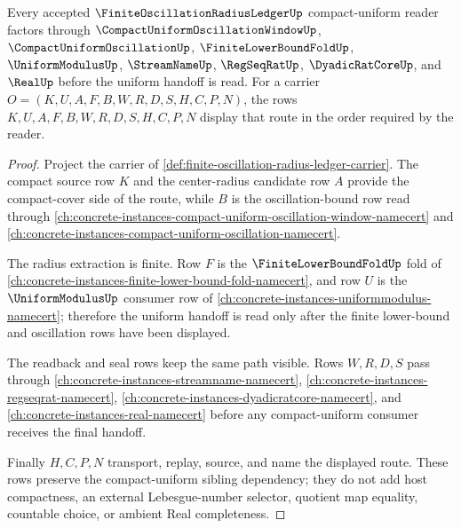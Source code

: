 \begin{theorem}
\label{thm:finite-oscillation-radius-ledger-compact-uniform-link}
Every accepted $\FiniteOscillationRadiusLedgerUp$ compact-uniform reader factors through $\CompactUniformOscillationWindowUp$, $\CompactUniformOscillationUp$, $\FiniteLowerBoundFoldUp$, $\UniformModulusUp$, $\StreamNameUp$, $\RegSeqRatUp$, $\DyadicRatCoreUp$, and $\RealUp$ before the uniform handoff is read. For a carrier $O=(K,U,A,F,B,W,R,D,S,H,C,P,N)$, the rows $K,U,A,F,B,W,R,D,S,H,C,P,N$ display that route in the order required by the reader.
\end{theorem}
\begin{proof}
Project the carrier of \autoref{def:finite-oscillation-radius-ledger-carrier}. The compact source row $K$ and the center-radius candidate row $A$ provide the compact-cover side of the route, while $B$ is the oscillation-bound row read through \autoref{ch:concrete-instances-compact-uniform-oscillation-window-namecert} and \autoref{ch:concrete-instances-compact-uniform-oscillation-namecert}.

The radius extraction is finite. Row $F$ is the $\FiniteLowerBoundFoldUp$ fold of \autoref{ch:concrete-instances-finite-lower-bound-fold-namecert}, and row $U$ is the $\UniformModulusUp$ consumer row of \autoref{ch:concrete-instances-uniformmodulus-namecert}; therefore the uniform handoff is read only after the finite lower-bound and oscillation rows have been displayed.

The readback and seal rows keep the same path visible. Rows $W,R,D,S$ pass through \autoref{ch:concrete-instances-streamname-namecert}, \autoref{ch:concrete-instances-regseqrat-namecert}, \autoref{ch:concrete-instances-dyadicratcore-namecert}, and \autoref{ch:concrete-instances-real-namecert} before any compact-uniform consumer receives the final handoff.

Finally $H,C,P,N$ transport, replay, source, and name the displayed route. These rows preserve the compact-uniform sibling dependency; they do not add host compactness, an external Lebesgue-number selector, quotient map equality, countable choice, or ambient Real completeness.
\end{proof}


